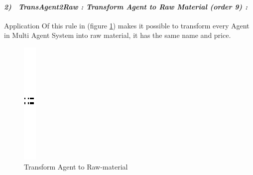 \paragraph{\emph{2)~ TransAgent2Raw : Transform Agent to Raw Material (order 9) :} }
Application Of this rule in (figure \ref{fig:Generate for each agent raw material}) makes it possible to transform  every Agent in Multi Agent System into raw material, it has the same name and price.
\vspace{1cm}
\begin{figure}[th]
\centering
	\quad{}
		\includegraphics{ch3/img/sep}
	\quad{}
\caption{\label{fig:Generate for each agent raw material}Transform Agent to Raw-material} 
\end{figure}
\vspace{1cm}

